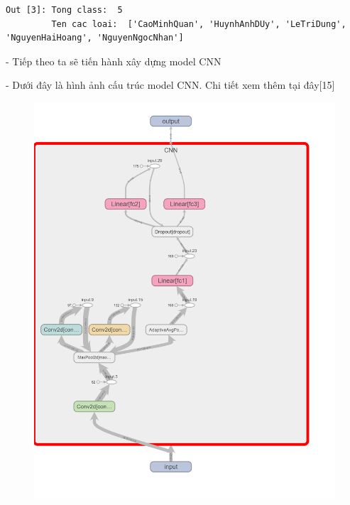 \documentclass[12pt, a4paper]{article}
\begin{document}
\begin{verbatim}
Out [3]: Tong class:  5
         Ten cac loai:  ['CaoMinhQuan', 'HuynhAnhDUy', 'LeTriDung', 'NguyenHaiHoang', 'NguyenNgocNhan']

\end{verbatim}


\newpage
\par - Tiếp theo ta sẽ tiến hành xây dựng model CNN
\par - Dưới đây là hình ảnh cấu trúc model CNN. Chi tiết xem thêm tại đây[15]

\begin{figure}[h] %
    \centering
    \includegraphics[scale = 0.2]{Img/Face/P1.png}
\end{figure}
\end{document}
